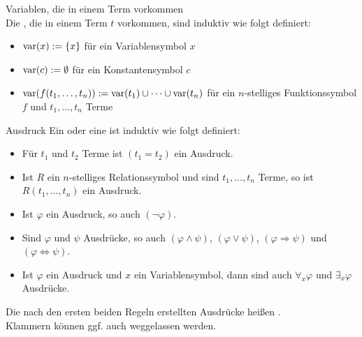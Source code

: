 \begin{Def}{Variablen, die in einem Term vorkommen}\\
    Die , die in einem Term $t$ vorkommen, sind induktiv
    wie folgt definiert:
    \begin{itemize}
        \item
        $\text{var}(x) := \{x\}$ für ein Variablensymbol $x$
        
        \item
        $\text{var}(c) := \emptyset$ für ein Konstantensymbol $c$
        
        \item
        $\text{var}(f(t_1, \dotsc, t_n)) := \text{var}(t_1) \cup \dotsb \cup \text{var}(t_n)$
        für ein $n$-stelliges Funktionssymbol $f$ und $t_1, \dotsc, t_n$ Terme
    \end{itemize}
\end{Def}

\linie

\begin{Def}{Ausdruck}
    Ein  oder eine  ist induktiv wie folgt definiert:
    \begin{itemize}
        \item
        Für $t_1$ und $t_2$ Terme ist $(t_1 = t_2)$ ein Ausdruck.
        
        \item
        Ist $R$ ein $n$-stelliges Relationssymbol und sind $t_1, \dotsc, t_n$
        Terme, so ist $R(t_1, \dotsc, t_n)$ ein Ausdruck.
        
        \item
        Ist $\varphi$ ein Ausdruck, so auch $(\lnot\varphi)$.
        
        \item
        Sind $\varphi$ und $\psi$ Ausdrücke, so auch $(\varphi \land \psi)$,
        $(\varphi \lor \psi)$, $(\varphi \Rightarrow \psi)$ und $(\varphi \Leftrightarrow \psi)$.
        
        \item
        Ist $\varphi$ ein Ausdruck und $x$ ein Variablensymbol, dann sind auch
        $\forall_x \varphi$ und $\exists_x \varphi$ Ausdrücke.
    \end{itemize}
    Die nach den ersten beiden Regeln erstellten Ausdrücke heißen .\\
    Klammern können ggf. auch weggelassen werden.
\end{Def}

